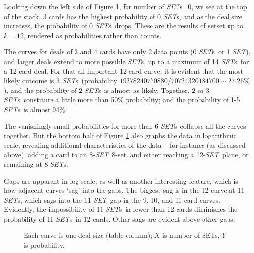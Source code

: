 \documentclass{article}
\newcommand{\SET}{{\em SET}}
\newcommand{\SETs}{{\em SET}s}
\newcommand{\SETSETb}{{\sc setset }}
\begin{document}
Looking down the left side of Figure \ref{FIGCOLS}, for number of \SETs=0, we
see at the top of the stack, 3 cards has the highest probability of 0 \SETs, and
as the deal size increases, the probability of 0 \SETs~drops. These are the
results of \SETSETb up to $k=12$, rendered as probabilities rather than counts. 

The curves for deals of 3 and 4 cards have only 2 data points (0 \SETs~or 1
\SET), and larger deals extend to more possible \SETs, up to a maximum of 14
\SETs~for a 12-card deal. For that all-important 12-card curve, it is evident
that the most likely outcome is 3 \SETs~(probability
$19278240770880/70724320184700\sim 27.26\%$), and the probability of 2 \SETs~is
almost as likely. Together, 2 or 3 \SETs~constitute a little more than 50\%
probability; and the probability of 1-5 \SETs~is almost 94\%.

The vanishingly small probabilities for more than 6 \SETs~collapse all the
curves together. But the bottom half of Figure \ref{FIGCOLS} also graphs the
data in logarithmic scale, revealing additional characteristics of the data --
for instance (as discussed above), adding a  card to an 8-\SET~8-set, and
either reaching a 12-\SET~plane, or remaining at 8 \SETs.

Gaps are apparent in log scale, as well as another interesting feature, which is
how adjacent curves `sag' into the gaps. The biggest sag is in the 12-curve at
11 \SETs, which sags into the 11-\SET~gap in the 9, 10, and 11-card
curves. Evidently, the impossibility of 11 \SETs~in fewer than 12 cards
diminishes the probability of 11 \SETs~in 12 cards. Other sags are evident above
other gaps.

\begin{figure}[!htb]
  \caption{\label{FIGCOLS} Each curve is one deal size (table column); $X$ is
    number of SETs, $Y$ is probability.}
\end{figure}
\end{document}
